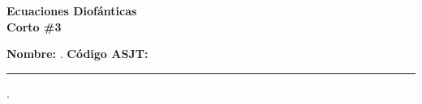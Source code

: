 \begin{center} \textbf
{
    \Large Ecuaciones Diofánticas \\ \vspace{2mm}Corto \#3
}
\end{center}

\vspace{8mm}

\textbf{Nombre:} \hrulefill.
\textbf{Código ASJT:} \rule{3cm}{0.1mm}.

\thispagestyle{first-page-style}